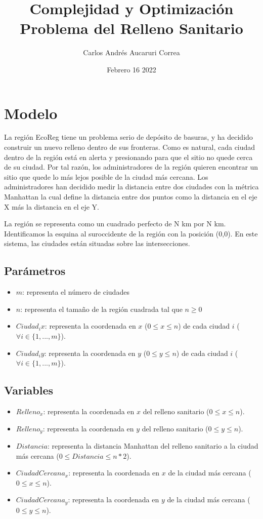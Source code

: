\documentclass{article}
\title{Complejidad y Optimización \\
Problema del Relleno Sanitario}
\author{Carlos Andrés Aucaruri Correa}
\date{Febrero 16 2022}
\begin{document}
\maketitle

\pagebreak

\tableofcontents

\pagebreak

\section{Modelo}
La región EcoReg tiene un problema serio de depósito de basuras, y ha decidido construir un nuevo relleno dentro de sus fronteras. Como es natural,
cada ciudad dentro de la región está en alerta y presionando para que el sitio no quede cerca de su ciudad. Por tal razón, los administradores de la región
quieren encontrar un sitio que quede lo más lejos posible de la ciudad más cercana. Los administradores
han decidido medir la distancia entre dos ciudades con la métrica Manhattan la cual define la distancia
entre dos puntos como la distancia en el eje X más la distancia en el eje Y.

La región se representa como un cuadrado perfecto de N km por N km. Identificamos la esquina al suroccidente de la región con la posición (0,0).
En este sistema, las ciudades están situadas sobre las intersecciones.

\subsection{Parámetros}
\begin{itemize}
    \item $m$: representa el número de ciudades
    \item $n$: representa el tamaño de la región cuadrada tal que $n \geq 0$
    \item $Ciudad_ix$: representa la coordenada en $x$ ($0 \leq x \leq n$) de cada ciudad $i$ ($\forall i \in \{1,...,m\}$).
    \item $Ciudad_iy$: representa la coordenada en $y$ ($0 \leq y \leq n$) de cada ciudad $i$ ($\forall i \in \{1,...,m\}$).
\end{itemize}

\subsection{Variables}
\begin{itemize}
    \item $Relleno_x$: representa la coordenada en $x$ del relleno sanitario ($0 \leq x \leq n$).
    \item $Relleno_y$: representa la coordenada en $y$ del relleno sanitario ($0 \leq y \leq n$).
    \item $Distancia$: representa la distancia Manhattan del relleno sanitario a la ciudad más cercana ($0 \leq Distancia \leq n*2$).
    \item $CiudadCercana_x$: representa la coordenada en $x$ de la ciudad más cercana ($0 \leq x \leq n$).
    \item $CiudadCercana_y$: representa la coordenada en $y$ de la ciudad más cercana ($0 \leq y \leq n$).
\end{itemize}
\end{document}
